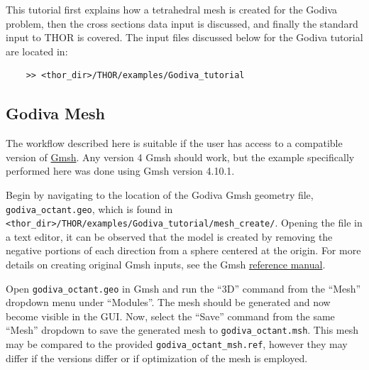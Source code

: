 This tutorial first explains how a tetrahedral mesh is created for the Godiva problem, then the cross sections data input is discussed, and finally the standard input to THOR is covered.
The input files discussed below for the Godiva tutorial are located in:
\begin{verbatim}
    >> <thor_dir>/THOR/examples/Godiva_tutorial
\end{verbatim}

\subsection{Godiva Mesh}\label{ch:tuts:sec:godiva:ssec:mesh}

The workflow described here is suitable if the user has access to a compatible version of \href{https://gmsh.info/}{Gmsh}.
Any version 4 Gmsh should work, but the example specifically performed here was done using Gmsh version 4.10.1.

Begin by navigating to the location of the Godiva Gmsh geometry file, \verb"godiva_octant.geo", which is found in \verb"<thor_dir>/THOR/examples/Godiva_tutorial/mesh_create/".
Opening the file in a text editor, it can be observed that the model is created by removing the negative portions of each direction from a sphere centered at the origin.
For more details on creating original Gmsh inputs, see the Gmsh \href{https://gmsh.info/doc/texinfo/gmsh.html}{reference manual}.

Open \verb"godiva_octant.geo" in Gmsh and run the ``3D'' command from the ``Mesh'' dropdown menu under ``Modules''.
The mesh should be generated and now become visible in the GUI.
Now, select the ``Save'' command from the same ``Mesh'' dropdown to save the generated mesh to \verb"godiva_octant.msh".
This mesh may be compared to the provided \verb"godiva_octant_msh.ref", however they may differ if the versions differ or if optimization of the mesh is employed.


